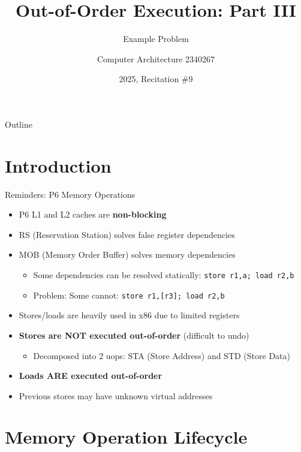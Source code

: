 \documentclass[aspectratio=169,12pt]{beamer}
\title{Out-of-Order Execution: Part III}
\subtitle{Example Problem}
\author{Computer Architecture 2340267}
\date{2025, Recitation \#9}
\begin{document}
\frame{\titlepage}

\begin{frame}{Outline}
\tableofcontents
\end{frame}

\section{Introduction}

\begin{frame}{Reminders: P6 Memory Operations}
\begin{itemize}
    \item P6 L1 and L2 caches are \textbf{non-blocking}
    \item RS (Reservation Station) solves false register dependencies
    \item MOB (Memory Order Buffer) solves memory dependencies
    \begin{itemize}
        \item Some dependencies can be resolved statically: \texttt{store r1,a; load r2,b}
        \item Problem: Some cannot: \texttt{store r1,[r3]; load r2,b}
    \end{itemize}
    \item Stores/loads are heavily used in x86 due to limited registers
    \item \textbf{Stores are NOT executed out-of-order} (difficult to undo)
    \begin{itemize}
        \item Decomposed into 2 uops: STA (Store Address) and STD (Store Data)
    \end{itemize}
    \item \textbf{Loads ARE executed out-of-order}
    \item Previous stores may have unknown virtual addresses
\end{itemize}
\end{frame}

\section{Memory Operation Lifecycle}
\end{document}

